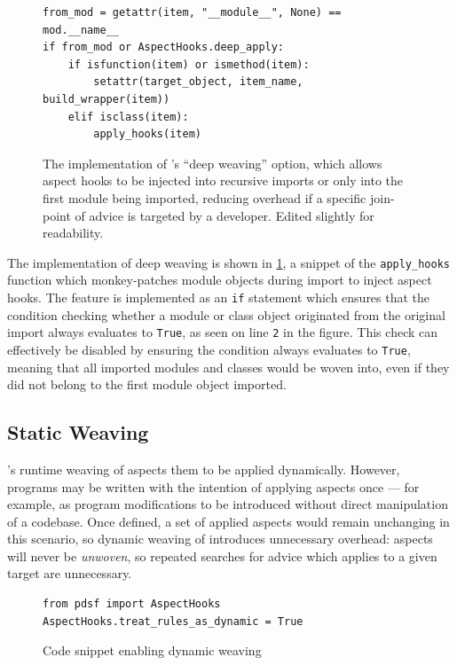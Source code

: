 \begin{figure}
    \begin{lstlisting}[style=footnotesize_python]
from_mod = getattr(item, "__module__", None) == mod.__name__
if from_mod or AspectHooks.deep_apply:
    if isfunction(item) or ismethod(item):
        setattr(target_object, item_name, build_wrapper(item))
    elif isclass(item):
        apply_hooks(item)
    \end{lstlisting}
    \caption{The implementation of \pdsfthree{}'s ``deep weaving'' option, which
    allows aspect hooks to be injected into recursive imports or only into the
    first module being imported, reducing overhead if a specific join-point of
    advice is targeted by a developer. Edited slightly for readability.}
    \label{fig:deep_weaving_optimisation_implementation}
\end{figure}

The implementation of deep weaving is shown in
\cref{fig:deep_weaving_optimisation_implementation}, a snippet of the
\lstinline{apply_hooks} function which monkey-patches module objects during
import to inject aspect hooks. The feature is implemented as an \lstinline{if}
statement which ensures that the condition checking whether a module or class
object originated from the original import always evaluates to \lstinline{True}, as seen
on line \texttt{2} in the figure. This check can effectively be disabled by
ensuring the condition always evaluates to \lstinline{True}, meaning that all
imported modules and classes would be woven into, even if they did not belong to
the first module object imported.


\subsection{Static Weaving}
\label{static_weaving}

\pdsfthree{}'s runtime weaving of aspects them to be applied dynamically. However,
programs may be written with the intention of applying aspects once --- for
example, as program modifications to be introduced without direct manipulation
of a codebase. Once defined, a set of applied aspects would remain unchanging in
this scenario, so dynamic weaving of \pdsfthree introduces unnecessary overhead:
aspects will never be \emph{unwoven}, so repeated searches for advice which
applies to a given target are unnecessary. 

\begin{figure}[h]
    \begin{lstlisting}[style=footnotesize_python]
from pdsf import AspectHooks
AspectHooks.treat_rules_as_dynamic = True
    \end{lstlisting}
    \caption{Code snippet enabling dynamic weaving}
    \label{fig:enabling_dynamic_weaving}
\end{figure}

